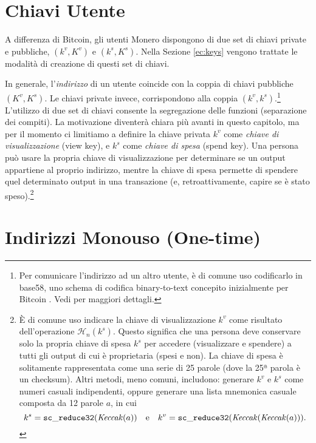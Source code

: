 \section{Chiavi Utente}
\label{sec:user-keys}

A differenza di Bitcoin, gli utenti Monero dispongono di due set di chiavi private e pubbliche, \((k^v, K^v)\) e \( (k^s, K^s) \). Nella Sezione \ref{ec:keys} vengono trattate le modalità di creazione di questi set di chiavi.

In generale, l'{\em indirizzo} di un utente coincide con la coppia di chiavi pubbliche \((K^v, K^s)\). Le chiavi private invece, corrispondono alla coppia \( (k^v, k^s) \).\footnote{Per comunicare l'indirizzo ad un altro utente, è di comune uso codificarlo in base58, uno schema di codifica binary-to-text concepito inizialmente per Bitcoin \cite{base-58-encoding}. Vedi \cite{luigi-address} per maggiori dettagli.}
\\

L'utilizzo di due set di chiavi consente la segregazione delle funzioni (separazione dei compiti). La motivazione diventerà chiara più avanti in questo capitolo, ma per il momento ci limitiamo a definire la chiave privata $k^v$ come {\em chiave di visualizzazione} (view key), e $k^s$ come {\em chiave di spesa} (spend key). Una persona può usare la propria chiave di visualizzazione per determinare se un output appartiene al proprio indirizzo, mentre la chiave di spesa permette di spendere quel determinato output in una transazione (e, retroattivamente, capire se è stato speso).\footnote{È di comune uso indicare la chiave di visualizzazione $k^v$ come risultato dell'operazione $\mathcal{H}_n(k^s)$. Questo significa che una persona deve conservare solo la propria chiave di spesa $k^s$ per accedere (visualizzare e spendere) a tutti gli output di cui è proprietaria (spesi e non). La chiave di spesa è solitamente rappresentata come una serie di 25 parole (dove la 25ª parola è un checksum). Altri metodi, meno comuni, includono: generare $k^v$ e $k^s$ come numeri casuali indipendenti, oppure generare una lista mnemonica casuale composta da 12 parole $a$, in cui
\[
k^s = {\tt sc\_reduce32}(\mathit{Keccak}(a)) \quad \text{e} \quad k^v = {\tt sc\_reduce32}(\mathit{Keccak}(\mathit{Keccak}(a))).
\]
\cite{luigi-address}}


\section{Indirizzi Monouso (One-time)}
\label{sec:one-time-addresses}

